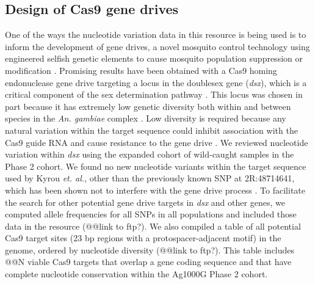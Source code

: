 \documentclass[a4paper,11pt,abstracton,hidelinks]{scrartcl}
\begin{document}
\subsection*{Design of Cas9 gene drives}


%
One of the ways the nucleotide variation data in this resource is being used is to inform the development of gene drives, a novel mosquito control technology using engineered selfish genetic elements to cause mosquito population suppression or modification \cite{burt2003, gantz2015, hammond2016, eckhoff2017, kyrou2018}.
%
Promising results have been obtained with a Cas9 homing endonuclease gene drive targeting a locus in the doublesex gene (\textit{dsx}), which is a critical component of the sex determination pathway \cite{kyrou2018}.
%
This locus was chosen in part because it has extremely low genetic diversity both within and between species in the \textit{An. gambiae} complex \cite{Ag1000gConsortium2017}.
%
Low diversity is required because any natural variation within the target sequence could inhibit association with the Cas9 guide RNA and cause resistance to the gene drive \cite{unckless2017}.
%
We reviewed nucleotide variation within \textit{dsx} using the expanded cohort of wild-caught samples in the Phase 2 cohort.
%
We found no new nucleotide variants within the target sequence used by Kyrou \textit{et. al.}, other than the previously known SNP at 2R:48714641, which has been shown not to interfere with the gene drive process \cite{kyrou2018}.
%
To facilitate the search for other potential gene drive targets in \textit{dsx} and other genes, we computed allele frequencies for all SNPs in all populations and included those data in the resource (@@link to ftp?).
%
We also compiled a table of all potential Cas9 target sites (23 bp regions with a protospacer-adjacent motif) in the genome, ordered by nucleotide diversity (@@link to ftp?).
%
This table includes @@N viable Cas9 targets that overlap a gene coding sequence and that have complete nucleotide conservation within the Ag1000G Phase 2 cohort.
\end{document}
